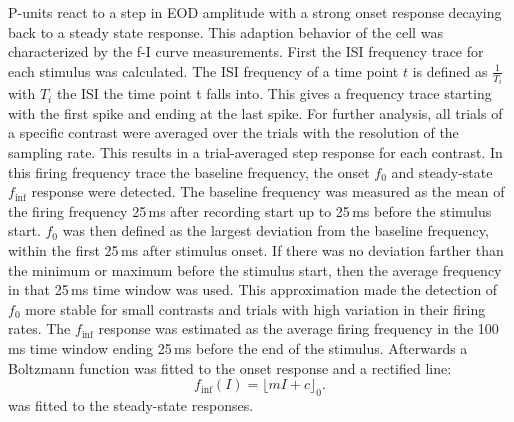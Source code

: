 \documentclass[12pt,a4paper]{article}
\begin{document}
P-units react to a step in EOD amplitude with a strong onset response decaying back to a steady state response. This
adaption behavior of the cell was characterized by the f-I curve measurements. First the ISI frequency trace for each stimulus was calculated. The ISI frequency of a time point $t$ is defined as $\frac{1}{T_{i}}$ with $T_{i}$ the ISI the time point t falls into. This gives a frequency trace
starting with the first spike and ending at the last spike. For further analysis, all trials of a specific contrast were averaged over the trials with the resolution of the sampling rate. This results in a trial-averaged step response for each contrast. In this firing frequency trace the baseline frequency, the onset $f_{0}$ and steady-state $f_{\inf}$ response were detected. The baseline frequency was measured as the mean of the firing frequency 25\,ms after recording start up to 25\,ms before the stimulus start. $f_{0}$ was then defined as the largest deviation from the baseline frequency, within the first 25\,ms after
stimulus onset. If there was no deviation farther than the minimum or maximum before the stimulus start, then the average frequency in that 25\,ms time window was used. This
approximation made the detection of $f_{0}$ more stable for small contrasts and trials with high variation in their firing rates. The $f_{\inf}$ response was estimated as the average firing frequency in the 100\,ms time window ending 25\,ms before the end of the stimulus. Afterwards a Boltzmann function was fitted to the onset response and a rectified line:
\begin{equation}
  \label{f_inf}
  f_{\inf}(I) = \lfloor mI+c \rfloor_0.
\end{equation}
was fitted to the steady-state responses.
\end{document}
